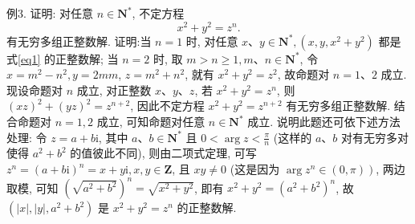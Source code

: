 例3. 证明: 对任意 $n \in \mathbf{N}^*$, 不定方程
$$
x^2+y^2=z^n . \label{eq1}
$$
有无穷多组正整数解.
证明:当 $n=1$ 时, 对任意 $x 、 y \in \mathbf{N}^*,\left(x, y, x^2+y^2\right)$ 都是 式\ref{eq1} 的正整数解; 当 $n=2$ 时, 取 $m>n \geqslant 1, m 、 n \in \mathbf{N}^*$, 令 $x=m^2-n^2, y=2 m m$, $z=m^2+n^2$, 就有 $x^2+y^2=z^2$, 故命题对 $n=1 、 2$ 成立.
现设命题对 $n$ 成立, 对正整数 $x 、 y 、 z$, 若 $x^2+y^2=z^n$, 则 $(x z)^2+ (y z)^2=z^{n+2}$, 因此不定方程 $x^2+y^2=z^{n+2}$ 有无穷多组正整数解.
结合命题对 $n=1,2$ 成立, 可知命题对任意 $n \in \mathbf{N}^*$ 成立.
说明此题还可依下述方法处理: 令 $z=a+b \mathrm{i}$, 其中 $a 、 b \in \mathbf{N}^*$ 且 $0< \arg z<\frac{\pi}{n}$ (这样的 $a 、 b$ 对有无穷多对使得 $a^2+b^2$ 的值彼此不同), 则由二项式定理, 可写 $z^n=(a+b \mathrm{i})^n=x+y \mathrm{i}, x, y \in \mathbf{Z}$, 且 $x y \neq 0$ (这是因为 $\left.\arg z^n \in(0, \pi)\right)$, 两边取模, 可知 $\left(\sqrt{a^2+b^2}\right)^n=\sqrt{x^2+y^2}$, 即有 $x^2+y^2= \left(a^2+b^2\right)^n$, 故 $\left(|x|,|y|, a^2+b^2\right)$ 是 $x^2+y^2=z^n$ 的正整数解.



